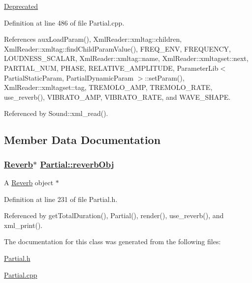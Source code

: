 \begin{Desc}
\item[\hyperlink{deprecated__deprecated000025}{Deprecated}]\end{Desc}


Definition at line 486 of file Partial.cpp.

References aux\-Load\-Param(), Xml\-Reader::xmltag::children, Xml\-Reader::xmltag::find\-Child\-Param\-Value(), FREQ\_\-ENV, FREQUENCY, LOUDNESS\_\-SCALAR, Xml\-Reader::xmltag::name, Xml\-Reader::xmltagset::next, PARTIAL\_\-NUM, PHASE, RELATIVE\_\-AMPLITUDE, Parameter\-Lib$<$ Partial\-Static\-Param, Partial\-Dynamic\-Param $>$::set\-Param(), Xml\-Reader::xmltagset::tag, TREMOLO\_\-AMP, TREMOLO\_\-RATE, use\_\-reverb(), VIBRATO\_\-AMP, VIBRATO\_\-RATE, and WAVE\_\-SHAPE.

Referenced by Sound::xml\_\-read().

\subsection{Member Data Documentation}
\hypertarget{classPartial_r0}{
\subsubsection[reverbObj]{\setlength{\rightskip}{0pt plus 5cm}\hyperlink{classReverb}{Reverb}$\ast$ \hyperlink{classPartial_r0}{Partial::reverb\-Obj}}}
\label{classPartial_r0}


A \hyperlink{classReverb}{Reverb} object $\ast$ 

Definition at line 231 of file Partial.h.

Referenced by get\-Total\-Duration(), Partial(), render(), use\_\-reverb(), and xml\_\-print().

The documentation for this class was generated from the following files:\begin{CompactItemize}
\item 
\hyperlink{Partial_8h}{Partial.h}\item 
\hyperlink{Partial_8cpp}{Partial.cpp}\end{CompactItemize}
